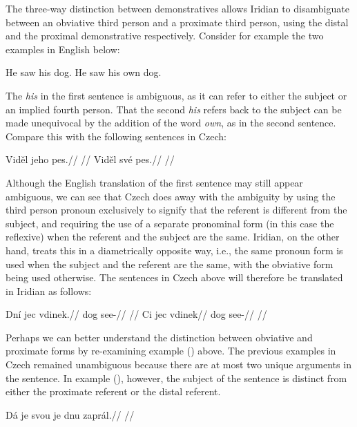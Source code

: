 The three-way distinction between demonstratives allows Iridian to disambiguate between an obviative third person and a proximate third person, using the distal and the proximal demonstrative respectively. Consider for example the two examples in English below:

\pex
\a He saw his dog.
\a He saw his own dog.\smallskip
\xe

The \emph{his} in the first sentence is ambiguous, as it can refer to either the subject or an implied fourth person. That the second \emph{his} refers back to the subject can be made unequivocal by the addition of the word \emph{own}, as in the second sentence. Compare this with the following sentences in Czech:

\begin{multicols}{2}
  \pex
  \a
  \begingl
  \gla Vid\v{e}l jeho pes.//
  \glft {}//
  \endgl
  \a \begingl
  \gla Vid\v{e}l sv\'e pes.//
  \glft {}//
  \endgl
  \xe
\end{multicols}

Although the English translation of the first sentence may still appear ambiguous, we can see that Czech does away with the ambiguity by using the third person pronoun  exclusively to signify that the referent is different from the subject, and requiring the use of a separate pronominal form (in this case the reflexive) when the referent and the subject are the same. Iridian, on the other hand, treats this in a diametrically opposite way, i.e., the same pronoun form is used when the subject and the referent are the same, with the obviative form being used otherwise. The sentences in Czech above will therefore be translated in Iridian as follows:

\pex
\a
\begingl
\gla Dn\'i jec vdinek.//
\glb {} dog see-//
\glft {}//
\endgl
\a \begingl
\gla Ci jec vdinek//
\glb {} dog see-//
\glft {}//
\endgl
\xe

Perhaps we can better understand the distinction between obviative and proximate forms by re-examining example () above. The previous examples in Czech remained unambiguous because there are at most two unique arguments in the sentence. In example (), however, the subject of the sentence is distinct from either the proximate referent or the distal referent.

\ex[exno={\getfullref{obv.obv1}}]
\begingl
\gla D\'a je svou je dnu zapr\'al.//
\glft {}//
\endgl
\xe

